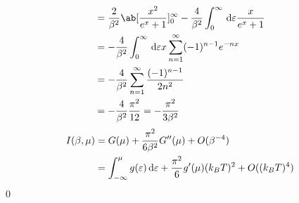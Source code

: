 \documentclass[uplatex,diffipdfmx,a4paper,11pt]{jlreq}
\makeatletter
\numberwithin{equation}{section}
\theoremstyle{definition}
\renewenvironment{proof}[1][\proofname]{\par
  \normalfont
  \topsep6\p@\@plus6\p@ \trivlist
  \item[\hskip\labelsep{\bfseries #1}\@addpunct{\bfseries}]\ignorespaces\quad\par
}{%
  \qed\endtrivlist\@endpefalse
}
\renewcommand\proofname{証明}
\makeatother
\begin{document}
\begin{proof}
\begin{align}
                                                                                  & = \frac{2}{\beta^2}\ab[\frac{x^2}{e^x + 1}]_{0}^{\infty} - \frac{4}{\beta^2}\int_{0}^{\infty}\dl{\varepsilon}\frac{x}{e^x + 1}                                      \\
                                                                                  & = - \frac{4}{\beta^2}\int_{0}^{\infty}\dl{\varepsilon}x\sum_{n=1}^{\infty}(-1)^{n-1}e^{-nx}                                                                         \\
                                                                                  & = - \frac{4}{\beta^2}\sum_{n=1}^{\infty}\frac{(-1)^{n-1}}{2n^2}                                                                                                     \\
                                                                                  & = - \frac{4}{\beta^2}\frac{\pi^2}{12} = -\frac{\pi^2}{3\beta^2}
  \end{align}
  \begin{align}
    I(\beta, \mu) & = G(\mu) + \frac{\pi^2}{6\beta^2}G''(\mu) + O(\beta^{-4})                                            \\
                  & = \int_{-\infty}^\mu g(\varepsilon)\dl{\varepsilon} + \frac{\pi^2}{6}g'(\mu)(k_BT)^2 + O((k_BT)^{4})
  \end{align}
\end{proof}
\end{document}
